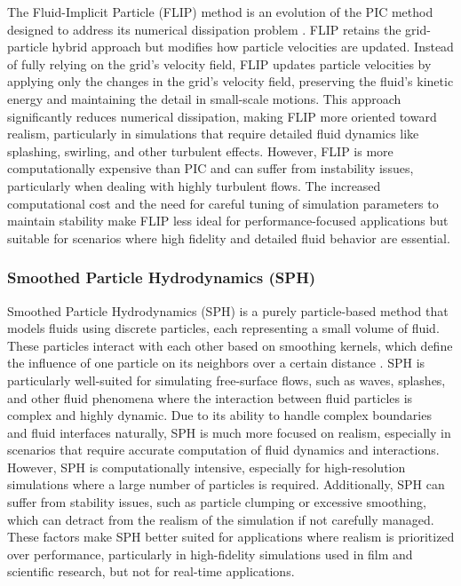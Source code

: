 The Fluid-Implicit Particle (FLIP) method is an evolution of the PIC method designed to address its numerical dissipation problem \cite{Brackbill1988}. FLIP retains the grid-particle hybrid approach but modifies how particle velocities are updated. Instead of fully relying on the grid's velocity field, FLIP updates particle velocities by applying only the changes in the grid's velocity field, preserving the fluid's kinetic energy and maintaining the detail in small-scale motions. This approach significantly reduces numerical dissipation, making FLIP more oriented toward realism, particularly in simulations that require detailed fluid dynamics like splashing, swirling, and other turbulent effects. However, FLIP is more computationally expensive than PIC and can suffer from instability issues, particularly when dealing with highly turbulent flows. The increased computational cost and the need for careful tuning of simulation parameters to maintain stability make FLIP less ideal for performance-focused applications but suitable for scenarios where high fidelity and detailed fluid behavior are essential.

\subsubsection{Smoothed Particle Hydrodynamics (SPH)}

Smoothed Particle Hydrodynamics (SPH) \cite{Muller2003} is a purely particle-based method that models fluids using discrete particles, each representing a small volume of fluid. These particles interact with each other based on smoothing kernels, which define the influence of one particle on its neighbors over a certain distance \cite{Koschier2022}. SPH is particularly well-suited for simulating free-surface flows, such as waves, splashes, and other fluid phenomena where the interaction between fluid particles is complex and highly dynamic. Due to its ability to handle complex boundaries and fluid interfaces naturally, SPH is much more focused on realism, especially in scenarios that require accurate computation of fluid dynamics and interactions. However, SPH is computationally intensive, especially for high-resolution simulations where a large number of particles is required. Additionally, SPH can suffer from stability issues, such as particle clumping or excessive smoothing, which can detract from the realism of the simulation if not carefully managed. These factors make SPH better suited for applications where realism is prioritized over performance, particularly in high-fidelity simulations used in film and scientific research, but not for real-time applications.

